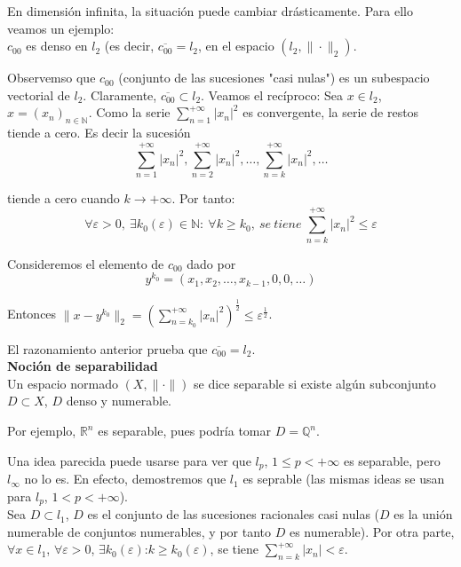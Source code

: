\documentclass{article}
\begin{document}
En dimensión infinita, la situación puede cambiar drásticamente. Para ello veamos un ejemplo:\\

$c_{00}$ es denso en $l_2$ (es decir, $\overline{c_{00}}=l_2$, en el espacio $(l_2,\|\cdot\|_2)$.

Observemso que $c_{00}$ (conjunto de las sucesiones "casi nulas") es un subespacio vectorial de $l_2$. Claramente, $\overline{c_{00}}\subset l_2$. Veamos el recíproco: Sea $x\in l_2$, $x=(x_n)_{n\in\mathbb{N}}$. Como la serie $\sum_{n=1}^{+\infty} |x_n|^2$ es convergente, la serie de restos tiende a cero. Es decir la sucesión
\begin{equation*}
\sum_{n=1}^{+\infty}|x_n|^2,\sum_{n=2}^{+\infty}|x_n|^2,\ldots,\sum_{n=k}^{+\infty}|x_n|^2,\ldots
\end{equation*}

tiende a cero cuando $k\to+\infty$. Por tanto:
\begin{equation*}
\forall \varepsilon>0,\:\exists k_0(\varepsilon)\in \mathbb{N}:\:\forall k\geq k_0,\:se\:tiene\:\sum_{n=k}^{+\infty}|x_n|^2\leq \varepsilon
\end{equation*}

Consideremos el elemento de $c_{00}$ dado por
\begin{equation*}
y^{k_0}=(x_1,x_2,\ldots,x_{k-1},0,0,\ldots)
\end{equation*}

Entonces $\|x-y^{k_0}\|_2=\left(\sum_{n=k_0}^{+\infty}|x_n|^2\right)^\frac{1}{2}\leq \varepsilon^\frac{1}{2}$.

El razonamiento anterior prueba que $\overline{c_{00}}=l_2$.\\

\textbf{Noción de separabilidad}\\

Un espacio normado $(X,\|\cdot\|)$ se dice separable si existe algún subconjunto $D\subset X$, $D$ denso y numerable.

Por ejemplo, $\mathbb{R}^n$ es separable, pues podría tomar $D=\mathbb{Q}^n$.

Una idea parecida puede usarse para ver que $l_p$, $1\leq p<+\infty$ es separable, pero $l_\infty$ no lo es. En efecto, demostremos que $l_1$ es seprable (las mismas ideas se usan para $l_p$, $1<p<+\infty$).\\

Sea $D\subset l_1$, $D$ es el conjunto de las sucesiones racionales casi nulas ($D$ es la unión numerable de conjuntos numerables, y por tanto $D$ es numerable). Por otra parte, $\forall x\in l_1$, $\forall \varepsilon >0$, $\exists k_0(\varepsilon)$:$k\geq k_0(\varepsilon)$, se tiene $\sum_{n=k}^{+\infty}|x_n|<\varepsilon$.
\end{document}
